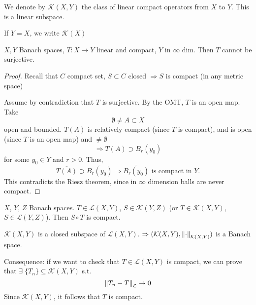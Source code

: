 \begin{definition}
    We denote by \(\mathcal{K}(X, Y)\) the class of linear compact operators from \(X \) to \(Y\). This is a linear subspace.

    If \(Y=X\), we write \(\mathcal{K}(X)\)
\end{definition}
\begin{proposition}
    \(X, Y\) Banach spaces, \(T:X \to Y\) linear and compact, \(Y\) in \(\infty\) dim. Then \(T\) cannot be surjective.
\end{proposition}
\begin{proof}
    Recall that \(C\) compact set, \(S \subset C\) closed \(\Rightarrow S\) is compact (in any metric space)

    Assume by contradiction that \(T\) is surjective. By the OMT, \(T\) is an open map. Take 
    \[
        \emptyset \neq A \subset X
    \]
    open and bounded. \(T(A)\) is relatively compact (since \(T\) is compact), and is open (since \(T\) is an open map) 
    and \(\neq \emptyset\)
    \[
        \Rightarrow T(A) \supset B_r(y_0)
    \]
    for some \(y_0 \in Y \) and \(r>0\). Thus, 
    \[
        \overline{T(A)} \supset \overline{B_r(y_0)} \Rightarrow \overline{B_r(y_0)} \text{ is compact in } Y.
    \] 
    This contradicts the Riesz theorem, since in \(\infty\) dimension balls are never compact. 
\end{proof}

\begin{proposition}
    \(X\), \(Y\), \(Z\) Banach spaces. \(T \in \mathcal{L}(X, Y)\), \(S \in \mathcal{K}(Y, Z)\) (or \(T \in \mathcal{K}(X, Y)\), \(S \in \mathcal{L}(Y, Z)\)). Then \(S \circ T\) is compact.
\end{proposition}
\begin{theorem}
    \(\mathcal{K}(X, Y) \) is a closed subspace of \(\mathcal{L}(X, Y)\). \(\Rightarrow (\mathcal{K}(X, Y), \norm{\cdot}_{\mathcal{K}(X, Y)})\) is a Banach space.
\end{theorem}
Consequence: if we want to check that \(T \in \mathcal{L}(X, Y)\) is compact, we can prove that \(\exists\; \{T_n\} \subseteq \mathcal{K}(X, Y)\) s.t. 
\[
    \norm{T_n - T}_{\mathcal{L}} \to 0
\]
Since \(\mathcal{K}(X, Y)\), it follows that \(T\) is compact.